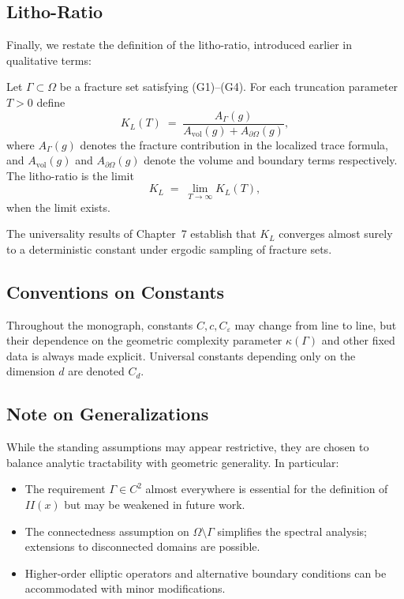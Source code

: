 \subsection{Litho-Ratio}

Finally, we restate the definition of the litho-ratio, introduced earlier in
qualitative terms:

\begin{definition}
Let $\Gamma \subset \Omega$ be a fracture set satisfying (G1)--(G4). For each
truncation parameter $T>0$ define
\[
    K_L(T) \;=\;
        \frac{A_\Gamma(g)}{A_{\mathrm{vol}}(g) + A_{\partial\Omega}(g)} ,
\]
where $A_\Gamma(g)$ denotes the fracture contribution in the localized trace
formula, and $A_{\mathrm{vol}}(g)$ and $A_{\partial\Omega}(g)$ denote the
volume and boundary terms respectively. The litho-ratio is the limit
\[
    K_L \;=\; \lim_{T\to\infty} K_L(T),
\]
when the limit exists.
\end{definition}

The universality results of Chapter~7 establish that $K_L$ converges almost
surely to a deterministic constant under ergodic sampling of fracture sets.

\subsection{Conventions on Constants}

Throughout the monograph, constants $C, c, C_\varepsilon$ may change from line
to line, but their dependence on the geometric complexity parameter
$\kappa(\Gamma)$ and other fixed data is always made explicit. Universal
constants depending only on the dimension $d$ are denoted $C_d$.

\subsection{Note on Generalizations}

While the standing assumptions may appear restrictive, they are chosen to
balance analytic tractability with geometric generality. In particular:

\begin{itemize}
  \item The requirement $\Gamma \in C^2$ almost everywhere is essential for the
  definition of $II(x)$ but may be weakened in future work.
  \item The connectedness assumption on $\Omega\setminus\Gamma$ simplifies the
  spectral analysis; extensions to disconnected domains are possible.
  \item Higher-order elliptic operators and alternative boundary conditions
  can be accommodated with minor modifications.
\end{itemize}

